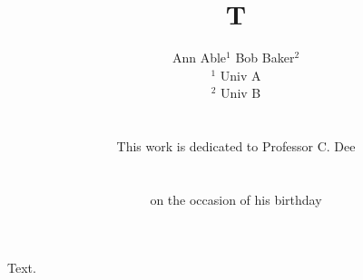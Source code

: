\documentclass{article}
\title{T}
\author{Ann Able${}^{1}$ \quad Bob Baker${}^{2}$\\
${}^1$ Univ A\\
${}^2$ Univ B\\
\mbox{ }\\
\centerline{This work is dedicated to Professor C. Dee}\\ \centerline{on the occasion of his birthday}}
\date{}
\begin{document}
\maketitle
Text.
\end{document}
